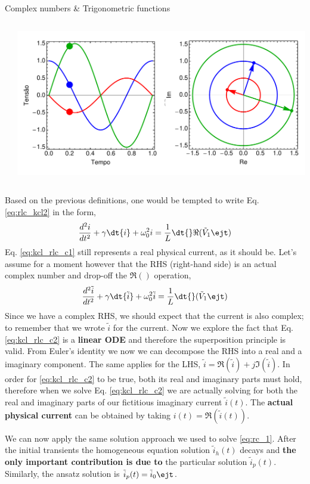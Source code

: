\begin{frame}[allowframebreaks]{Complex numbers \& Trigonometric functions}
\begin{columns}
\begin{column}{0.5\textwidth}
	\end{column}
	\begin{column}{0.5\textwidth}
		\includegraphics[width=\textwidth]{fasor0p2.pdf}
	\end{column}
\end{columns}

Based on the previous definitions, one would be tempted to write Eq. \ref{eq:rlc_kcl2} in the form,
\begin{equation}
\frac{d^2i}{dt^2} + \gamma \dt{i} + \omega_0^2i=\frac{1}{L}\dt{ }\Re (\tilde{V}_1\ejt)
\label{eq:kcl_rlc_c1}
\end{equation}
Eq. \ref{eq:kcl_rlc_c1} still represents a real physical current, as it should be. Let's assume for a moment however that the RHS (right-hand side) is an actual complex number and drop-off the $\Re()$ operation,
\begin{equation}
\frac{d^2\tilde{i}}{dt^2} + \gamma \dt{\tilde{i}} + \omega_0^2\tilde{i}=\frac{1}{L}\dt{ }(\tilde{V}_1\ejt)
\label{eq:kcl_rlc_c2}
\end{equation}
Since we have a complex RHS, we should expect that the current is also complex; to remember that we wrote $\tilde{i}$ for the current. Now we explore the fact that Eq. \ref{eq:kcl_rlc_c2} is a \textbf{linear ODE} and therefore the superposition principle is valid. From Euler's identity we now we can decompose the RHS into a real and a imaginary component. The same applies for the LHS, $\tilde{i}=\Re(\tilde{i})+j\Im(\tilde{i})$. In order for \ref{eq:kcl_rlc_c2} to be true, both its real and imaginary parts must hold, therefore when we solve Eq. \ref{eq:kcl_rlc_c2} we are actually solving for both the real and imaginary parts of our fictitious imaginary current $\tilde{i}(t)$. The \textbf{actual physical current} can be obtained by taking $i(t)=\Re(\tilde{i}(t))$.

We can now apply the same solution approach we used to solve \ref{eq:rc_1}. After the initial transients the homogeneous equation solution $\tilde{i}_h(t)$ decays and \textbf{the only important contribution is due to} the particular solution $\tilde{i}_p(t)$. Similarly, the ansatz solution is $\tilde{i}_p(t)=\tilde{i}_0 \ejt$. 


\end{frame}
